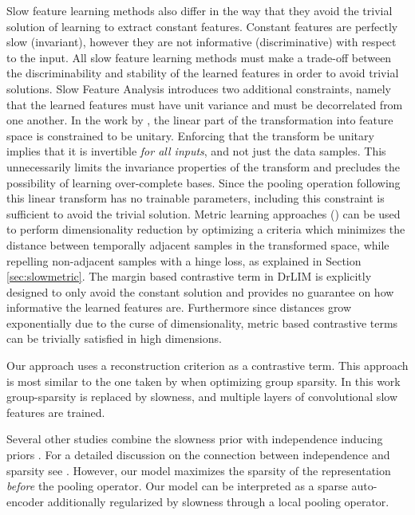 \documentclass{article} %
\begin{document}
Slow feature learning methods also differ in the way that they avoid the trivial solution of learning to extract constant features. Constant features are perfectly slow (invariant), however they are not informative (discriminative) with respect to the input. All slow feature learning methods must make a trade-off between the discriminability and stability of the learned features in order to avoid trivial solutions. Slow Feature Analysis introduces two additional constraints, namely that the learned features must have unit variance and must be decorrelated from one another. In the work by \cite{complexCells}, the linear part of the transformation into feature space is constrained to be unitary. Enforcing that the transform be unitary implies that it is invertible \emph{for all inputs}, and not just the data samples. This unnecessarily limits the invariance properties of the transform and precludes the possibility of learning over-complete bases. Since the pooling operation following this linear transform has no trainable parameters, including this constraint is sufficient to avoid the trivial solution. Metric learning approaches (\cite{DrLIM}) can be used to perform dimensionality reduction by optimizing a criteria which minimizes the distance between temporally adjacent samples in the transformed space, while repelling non-adjacent samples with a hinge loss, as explained in Section \ref{sec:slowmetric}. The margin based contrastive term in DrLIM is explicitly designed to only avoid the constant solution and provides no guarantee on how informative the learned features are. Furthermore since distances grow exponentially due to the curse of dimensionality, metric based contrastive terms can be trivially satisfied in high dimensions.

Our approach uses a reconstruction criterion as a contrastive term. This approach is most similar to the one taken by \cite{groupSparsity} when optimizing group sparsity. In this work group-sparsity is replaced by slowness, and multiple layers of convolutional slow features are trained. 

Several other studies combine the slowness prior with independence inducing priors \cite{complexCells, Cadieu, zou2012deep}. For a detailed discussion on the connection between independence and sparsity see \cite{Huyvarinen}. However, our model maximizes the sparsity of the representation \emph{before} the pooling operator. Our model can be interpreted as a sparse auto-encoder additionally regularized by slowness through a local pooling operator.   
\end{document}
